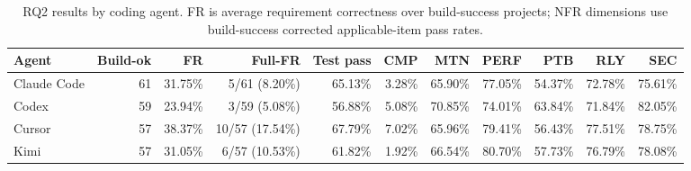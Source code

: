 \begin{table}[t]
\centering
\small
\caption{RQ2 results by coding agent. FR is average requirement correctness over build-success projects; NFR dimensions use build-success corrected applicable-item pass rates.}
\label{tab:rq2-main-results}
\begin{tabular}{lrrrrrrrrrr}
\toprule
Agent & Build-ok & FR & Full-FR & Test pass & CMP & MTN & PERF & PTB & RLY & SEC \\
\midrule
Claude Code & 61 & 31.75\% & 5/61 (8.20\%) & 65.13\% & 3.28\% & 65.90\% & 77.05\% & 54.37\% & 72.78\% & 75.61\% \\
Codex & 59 & 23.94\% & 3/59 (5.08\%) & 56.88\% & 5.08\% & 70.85\% & 74.01\% & 63.84\% & 71.84\% & 82.05\% \\
Cursor & 57 & 38.37\% & 10/57 (17.54\%) & 67.79\% & 7.02\% & 65.96\% & 79.41\% & 56.43\% & 77.51\% & 78.75\% \\
Kimi & 57 & 31.05\% & 6/57 (10.53\%) & 61.82\% & 1.92\% & 66.54\% & 80.70\% & 57.73\% & 76.79\% & 78.08\% \\
\bottomrule
\end{tabular}
\end{table}
